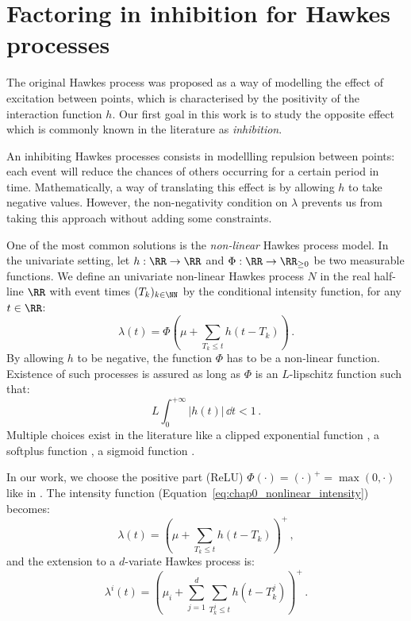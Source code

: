 
\section{Factoring in inhibition for Hawkes processes}\label{sec:chap0_inhibition}
    
    The original Hawkes process was proposed as a way of modelling the effect of excitation between points, which is characterised by the positivity of the interaction function $h$.
    Our first goal in this work is to study the opposite effect which is commonly known in the literature as \emph{inhibition}.
    
    An inhibiting Hawkes processes consists in modellling repulsion between points: each event will reduce the chances of others occurring for a certain period in time.
    Mathematically, a way of translating this effect is by allowing $h$ to take negative values. However, the non-negativity condition on $\lambda$ prevents us from taking this approach without adding some constraints.

    One of the most common solutions is the \emph{non-linear} Hawkes process model. In the univariate setting, let $h:\RR \to \RR$ and $\Phi:\RR\to\RR_{\geq 0}$ be two measurable functions. We define an univariate non-linear Hawkes process $N$ in the real half-line $\RR$ with event times $(T_k)_{k\in\NN}$ by the conditional intensity function, for any $t\in\RR$:
    \begin{equation}\label{eq:chap0_nonlinear_intensity}
      \lambda(t) = \Phi\left(\mu + \sum_{T_k \leq t}{h(t-T_k)}\right)\,.
    \end{equation}
    By allowing $h$ to be negative, the function $\Phi$ has to be a non-linear function. Existence of such processes is assured as long as $\Phi$ is an $L$-lipschitz function \parencite[Theorem 1]{Bremaud1996} such that:
    \[L\int_{0}^{+\infty}{\lvert h(t)\rvert\,\dd t} <1\,.\]
    Multiple choices exist in the literature like a clipped exponential function \parencite{Chornoboy1988,Carstensen2010,Gerhard2017}, a softplus function \parencite{Mei2017}, a sigmoid function \parencite{Menon2018}.
    
    In our work, we choose the positive part (ReLU) $\Phi(\cdot) = (\cdot)^+ = \max(0, \cdot)$ like in \textcite{Lemonnier2014, Hansen2015, Lu2018, Costa2020}.
    The intensity function (Equation~\eqref{eq:chap0_nonlinear_intensity}) becomes:
    \begin{equation}\label{eq:chap0_nonlinear_univariate_intensity}
      \lambda(t) = \left(\mu + \sum_{T_k \leq t}{h(t-T_k)}\right)^+\,,
    \end{equation}
    and the extension to a $d$-variate Hawkes process is:
    \begin{equation}\label{eq:chap0_nonlinear_multivariate_intensity}
      \lambda^i(t) = \left(\mu_i + \sum_{j=1}^{d}\sum_{T_k^j \leq t}{h(t-T_k^j)}\right)^+\,.
    \end{equation}

